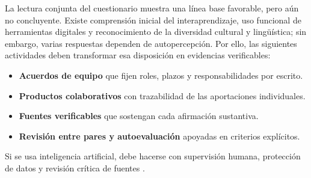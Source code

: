 \documentclass[
  spanish,
  letterpaper, oneside
]{article}
\begin{document}
La lectura conjunta del cuestionario muestra una línea base favorable, pero aún
no concluyente. Existe comprensión inicial del interaprendizaje, uso funcional de
herramientas digitales y reconocimiento de la diversidad cultural y lingüística;
sin embargo, varias respuestas dependen de autopercepción. Por ello, las
siguientes actividades deben transformar esa disposición en evidencias verificables:

\begin{itemize}
  \item \textbf{Acuerdos de equipo} que fijen roles, plazos y responsabilidades por escrito.
  \item \textbf{Productos colaborativos} con trazabilidad de las aportaciones individuales.
  \item \textbf{Fuentes verificables} que sostengan cada afirmación sustantiva.
  \item \textbf{Revisión entre pares y autoevaluación} apoyadas en criterios explícitos.
\end{itemize}

Si se usa inteligencia artificial, debe
hacerse con supervisión humana, protección de datos y revisión crítica de fuentes
\citep{unescoGenerativeAI2023}.

%
\end{document}
